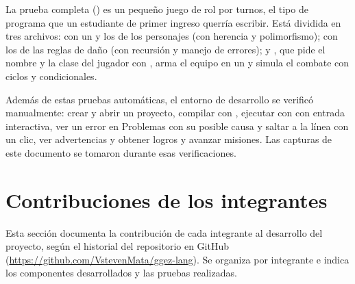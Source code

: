 

La prueba completa () es un pequeño juego de rol por turnos, el tipo de programa que un estudiante de primer ingreso querría escribir. Está dividida en tres archivos:  con un  y los  de los personajes (con herencia y polimorfismo);  con los  de las reglas de daño (con recursión y manejo de errores); y , que pide el nombre y la clase del jugador con , arma el equipo en un  y simula el combate con ciclos y condicionales.

Además de estas pruebas automáticas, el entorno de desarrollo se verificó manualmente: crear y abrir un proyecto, compilar con , ejecutar con  con entrada interactiva, ver un error en Problemas con su posible causa y saltar a la línea con un clic, ver advertencias y obtener logros y avanzar misiones. Las capturas de este documento se tomaron durante esas verificaciones.

\newpage
\section{Contribuciones de los integrantes}

Esta sección documenta la contribución de cada integrante al desarrollo del proyecto, según el historial del repositorio en GitHub (\url{https://github.com/VstevenMata/ggez-lang}). Se organiza por integrante e indica los componentes desarrollados y las pruebas realizadas.

